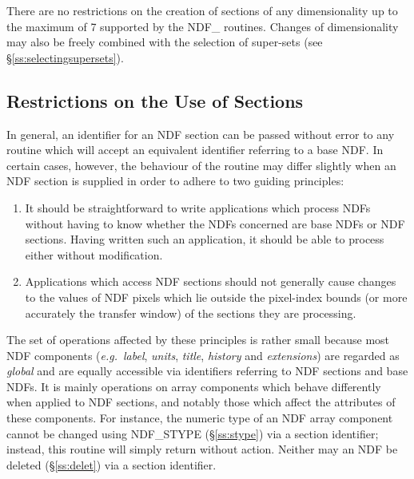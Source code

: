 \documentclass[twoside,11pt]{article}
\newcommand{\htmlref}[2]{#1}
\newcommand{\xlabel}[1]{}
\newcommand{\st}[1]{{\em{#1}}}
\begin{document}
There are no restrictions on the creation of sections of any dimensionality
up to the maximum of 7 supported by the NDF\_ routines.
Changes of dimensionality may also be freely combined with the selection of
super-sets (see \S\ref{ss:selectingsupersets}).

\subsection{\xlabel{restrictions_on_the_use_of_sections}\label{ss:sectionrestrictions}Restrictions on the Use of Sections}

In general, an identifier for an NDF section can be passed without error to
any routine which will accept an equivalent identifier referring to a base
NDF. 
In certain cases, however, the behaviour of the routine may differ slightly
when an NDF section is supplied in order to adhere to two guiding
principles: 

\begin{enumerate}

\item
It should be straightforward to write applications which process NDFs without
having to know whether the NDFs concerned are base NDFs or NDF sections. 
Having written such an application, it should be able to process either without
modification. 

\item
Applications which access NDF sections should not generally cause changes to the
values of NDF pixels which lie outside the pixel-index bounds (or more
accurately the transfer window) of the sections they are processing. 

\end{enumerate}

The set of operations affected by these principles is rather small because
most NDF components (\st{e.g.}\ \st{label}, \st{units}, \st{title},
\st{history\/} and \st{extensions\/}) are regarded as \st{global\/}
and are equally 
accessible via identifiers referring to NDF sections and base NDFs. 
It is mainly operations on array components which behave differently when
applied to NDF sections, and notably those which affect the attributes of
these components. 
For instance, the numeric type of an NDF array component cannot be changed
using \htmlref{NDF\_STYPE}{NDF_STYPE} (\S\ref{ss:stype}) via a section identifier; instead, this
routine will simply return without action. 
Neither may an NDF be deleted (\S\ref{ss:delet}) via a section identifier.
\end{document}
